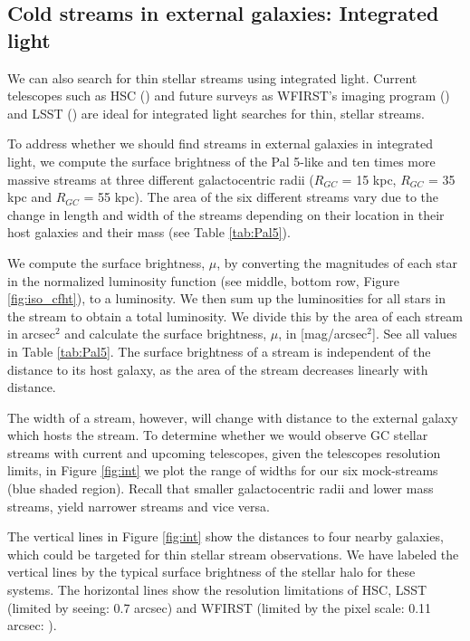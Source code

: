 \documentclass[twocolumn]{aastex62}
\begin{document}
\subsection{Cold streams in external galaxies: Integrated light}
\label{sec:integrated}
We can also search for thin stellar streams using integrated light. Current telescopes such as HSC (\citealt{miyazaki12}) and future surveys as WFIRST's imaging program (\citealt{spergel13}) and LSST  (\citealt{ivezi08}) are ideal for integrated light searches for thin, stellar streams. 

To address whether we should find streams in external galaxies in integrated light, we compute the surface brightness of the Pal 5-like and ten times more massive streams at three different galactocentric radii ($R_{GC}$ = 15  kpc, $R_{GC}$ = 35 kpc and $R_{GC}$ = 55 kpc). The area of the six different streams vary due to the change in length and width of the streams depending on their location in their host galaxies and their mass (see Table \ref{tab:Pal5}).

We compute the surface brightness, $\mu$, by converting the magnitudes of each star in the normalized luminosity function (see middle, bottom row, Figure \ref{fig:iso_cfht}), to a luminosity. We then sum up the luminosities for all stars in the stream to obtain a total luminosity. We divide this by the area of each stream in arcsec$^2$ and calculate the surface brightness, $\mu$, in [mag/arcsec$^2$]. See all values in Table \ref{tab:Pal5}. The surface brightness of a stream is independent of the distance to its host galaxy, as the area of the stream decreases linearly with distance. 

The width of a stream, however, will change with distance to the external galaxy which hosts the stream. To determine whether we would observe GC stellar streams with current and upcoming telescopes, given the telescopes resolution limits, in Figure \ref{fig:int} we plot the range of widths for our six mock-streams (blue shaded region). Recall that smaller galactocentric radii and lower mass streams, yield narrower streams and vice versa. %

The vertical lines in Figure \ref{fig:int} show the distances to four nearby galaxies, which could be targeted for thin stellar stream observations. We have labeled the vertical lines by the typical surface brightness of the stellar halo for these systems. The horizontal lines show the resolution limitations of HSC, LSST (limited by seeing: 0.7 arcsec) and WFIRST (limited by the pixel scale: 0.11 arcsec: \citealt{spergel13}).
\end{document}
